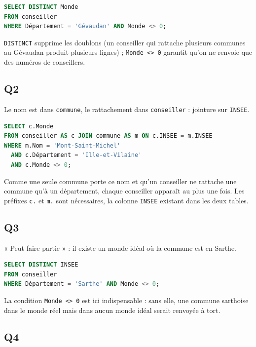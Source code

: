 \documentclass[11pt,a4paper]{article}
\begin{document}
\begin{lstlisting}[language=SQL]
SELECT DISTINCT Monde
FROM conseiller
WHERE Département = 'Gévaudan' AND Monde <> 0;
\end{lstlisting}

\texttt{DISTINCT} supprime les doublons (un conseiller qui rattache plusieurs communes au Gévaudan produit plusieurs lignes) ; \texttt{Monde\ \textless{}\textgreater{}\ 0} garantit qu'on ne renvoie que des numéros de conseillers.

\hypertarget{q2}{%
\subsection{Q2}\label{q2}}

Le nom est dans \texttt{commune}, le rattachement dans \texttt{conseiller} : jointure sur \texttt{INSEE}.

\begin{lstlisting}[language=SQL]
SELECT c.Monde
FROM conseiller AS c JOIN commune AS m ON c.INSEE = m.INSEE
WHERE m.Nom = 'Mont-Saint-Michel'
  AND c.Département = 'Ille-et-Vilaine'
  AND c.Monde <> 0;
\end{lstlisting}

Comme une seule commune porte ce nom et qu'un conseiller ne rattache une commune qu'à un département, chaque conseiller apparaît au plus une fois. Les préfixes \texttt{c.} et \texttt{m.} sont nécessaires, la colonne \texttt{INSEE} existant dans les deux tables.

\hypertarget{q3}{%
\subsection{Q3}\label{q3}}

« Peut faire partie » : il existe un monde idéal où la commune est en Sarthe.

\begin{lstlisting}[language=SQL]
SELECT DISTINCT INSEE
FROM conseiller
WHERE Département = 'Sarthe' AND Monde <> 0;
\end{lstlisting}

La condition \texttt{Monde\ \textless{}\textgreater{}\ 0} est ici indispensable : sans elle, une commune sarthoise dans le monde réel mais dans aucun monde idéal serait renvoyée à tort.

\hypertarget{q4}{%
\subsection{Q4}\label{q4}}
\end{document}
